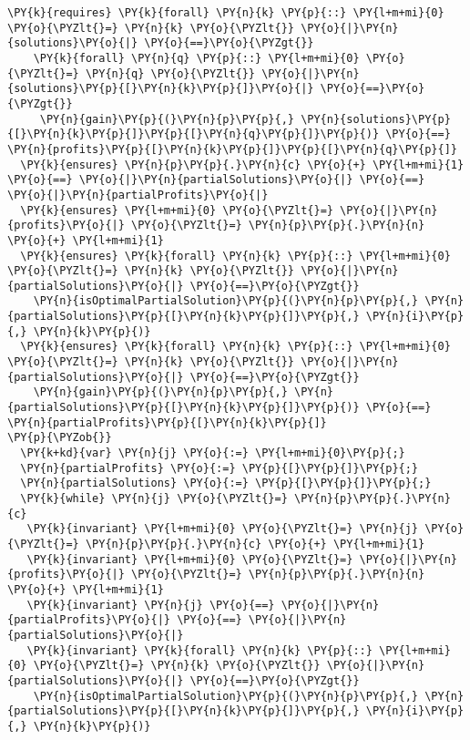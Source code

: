 \begin{sloppypar}
\begin{Verbatim}[commandchars=\\\{\}]
  \PY{k}{requires} \PY{k}{forall} \PY{n}{k} \PY{p}{::} \PY{l+m+mi}{0} \PY{o}{\PYZlt{}=} \PY{n}{k} \PY{o}{\PYZlt{}} \PY{o}{|}\PY{n}{solutions}\PY{o}{|} \PY{o}{==}\PY{o}{\PYZgt{}} 
    \PY{k}{forall} \PY{n}{q} \PY{p}{::} \PY{l+m+mi}{0} \PY{o}{\PYZlt{}=} \PY{n}{q} \PY{o}{\PYZlt{}} \PY{o}{|}\PY{n}{solutions}\PY{p}{[}\PY{n}{k}\PY{p}{]}\PY{o}{|} \PY{o}{==}\PY{o}{\PYZgt{}} 
     \PY{n}{gain}\PY{p}{(}\PY{n}{p}\PY{p}{,} \PY{n}{solutions}\PY{p}{[}\PY{n}{k}\PY{p}{]}\PY{p}{[}\PY{n}{q}\PY{p}{]}\PY{p}{)} \PY{o}{==} \PY{n}{profits}\PY{p}{[}\PY{n}{k}\PY{p}{]}\PY{p}{[}\PY{n}{q}\PY{p}{]}
  \PY{k}{ensures} \PY{n}{p}\PY{p}{.}\PY{n}{c} \PY{o}{+} \PY{l+m+mi}{1} \PY{o}{==} \PY{o}{|}\PY{n}{partialSolutions}\PY{o}{|} \PY{o}{==} \PY{o}{|}\PY{n}{partialProfits}\PY{o}{|}
  \PY{k}{ensures} \PY{l+m+mi}{0} \PY{o}{\PYZlt{}=} \PY{o}{|}\PY{n}{profits}\PY{o}{|} \PY{o}{\PYZlt{}=} \PY{n}{p}\PY{p}{.}\PY{n}{n} \PY{o}{+} \PY{l+m+mi}{1} 
  \PY{k}{ensures} \PY{k}{forall} \PY{n}{k} \PY{p}{::} \PY{l+m+mi}{0} \PY{o}{\PYZlt{}=} \PY{n}{k} \PY{o}{\PYZlt{}} \PY{o}{|}\PY{n}{partialSolutions}\PY{o}{|} \PY{o}{==}\PY{o}{\PYZgt{}} 
    \PY{n}{isOptimalPartialSolution}\PY{p}{(}\PY{n}{p}\PY{p}{,} \PY{n}{partialSolutions}\PY{p}{[}\PY{n}{k}\PY{p}{]}\PY{p}{,} \PY{n}{i}\PY{p}{,} \PY{n}{k}\PY{p}{)}
  \PY{k}{ensures} \PY{k}{forall} \PY{n}{k} \PY{p}{::} \PY{l+m+mi}{0} \PY{o}{\PYZlt{}=} \PY{n}{k} \PY{o}{\PYZlt{}} \PY{o}{|}\PY{n}{partialSolutions}\PY{o}{|} \PY{o}{==}\PY{o}{\PYZgt{}} 
    \PY{n}{gain}\PY{p}{(}\PY{n}{p}\PY{p}{,} \PY{n}{partialSolutions}\PY{p}{[}\PY{n}{k}\PY{p}{]}\PY{p}{)} \PY{o}{==} \PY{n}{partialProfits}\PY{p}{[}\PY{n}{k}\PY{p}{]}
\PY{p}{\PYZob{}}
  \PY{k+kd}{var} \PY{n}{j} \PY{o}{:=} \PY{l+m+mi}{0}\PY{p}{;}
  \PY{n}{partialProfits} \PY{o}{:=} \PY{p}{[}\PY{p}{]}\PY{p}{;}
  \PY{n}{partialSolutions} \PY{o}{:=} \PY{p}{[}\PY{p}{]}\PY{p}{;}
  \PY{k}{while} \PY{n}{j} \PY{o}{\PYZlt{}=} \PY{n}{p}\PY{p}{.}\PY{n}{c}
   \PY{k}{invariant} \PY{l+m+mi}{0} \PY{o}{\PYZlt{}=} \PY{n}{j} \PY{o}{\PYZlt{}=} \PY{n}{p}\PY{p}{.}\PY{n}{c} \PY{o}{+} \PY{l+m+mi}{1}
   \PY{k}{invariant} \PY{l+m+mi}{0} \PY{o}{\PYZlt{}=} \PY{o}{|}\PY{n}{profits}\PY{o}{|} \PY{o}{\PYZlt{}=} \PY{n}{p}\PY{p}{.}\PY{n}{n} \PY{o}{+} \PY{l+m+mi}{1}
   \PY{k}{invariant} \PY{n}{j} \PY{o}{==} \PY{o}{|}\PY{n}{partialProfits}\PY{o}{|} \PY{o}{==} \PY{o}{|}\PY{n}{partialSolutions}\PY{o}{|}
   \PY{k}{invariant} \PY{k}{forall} \PY{n}{k} \PY{p}{::} \PY{l+m+mi}{0} \PY{o}{\PYZlt{}=} \PY{n}{k} \PY{o}{\PYZlt{}} \PY{o}{|}\PY{n}{partialSolutions}\PY{o}{|} \PY{o}{==}\PY{o}{\PYZgt{}} 
    \PY{n}{isOptimalPartialSolution}\PY{p}{(}\PY{n}{p}\PY{p}{,} \PY{n}{partialSolutions}\PY{p}{[}\PY{n}{k}\PY{p}{]}\PY{p}{,} \PY{n}{i}\PY{p}{,} \PY{n}{k}\PY{p}{)}

\end{Verbatim}
\end{sloppypar}
